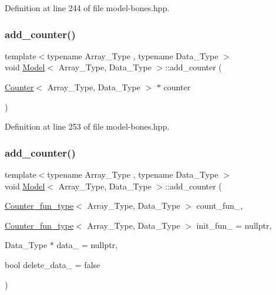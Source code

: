 Definition at line 244 of file model-\/bones.\+hpp.

\mbox{\label{class_model_a05265a5a9a12109a4a2b56b3bb42015e}} 
\subsubsection{\texorpdfstring{add\+\_\+counter()}{add\_counter()}\hspace{0.1cm}{\footnotesize\ttfamily [2/3]}}
{\footnotesize\ttfamily template$<$typename Array\+\_\+\+Type , typename Data\+\_\+\+Type $>$ \\
void \hyperlink{class_model}{Model}$<$ Array\+\_\+\+Type, Data\+\_\+\+Type $>$\+::add\+\_\+counter (\begin{DoxyParamCaption}\item[{\hyperlink{class_counter}{Counter}$<$ Array\+\_\+\+Type, Data\+\_\+\+Type $>$ $\ast$}]{counter }\end{DoxyParamCaption})\hspace{0.3cm}{\ttfamily [inline]}}



Definition at line 253 of file model-\/bones.\+hpp.

\mbox{\label{class_model_a950b0429e07047d4774eac60f7c335f2}} 
\subsubsection{\texorpdfstring{add\+\_\+counter()}{add\_counter()}\hspace{0.1cm}{\footnotesize\ttfamily [3/3]}}
{\footnotesize\ttfamily template$<$typename Array\+\_\+\+Type , typename Data\+\_\+\+Type $>$ \\
void \hyperlink{class_model}{Model}$<$ Array\+\_\+\+Type, Data\+\_\+\+Type $>$\+::add\+\_\+counter (\begin{DoxyParamCaption}\item[{\hyperlink{typedefs_8hpp_ac0160f52f564dea3ac033b374cffbfe7}{Counter\+\_\+fun\+\_\+type}$<$ Array\+\_\+\+Type, Data\+\_\+\+Type $>$}]{count\+\_\+fun\+\_\+,  }\item[{\hyperlink{typedefs_8hpp_ac0160f52f564dea3ac033b374cffbfe7}{Counter\+\_\+fun\+\_\+type}$<$ Array\+\_\+\+Type, Data\+\_\+\+Type $>$}]{init\+\_\+fun\+\_\+ = {\ttfamily nullptr},  }\item[{Data\+\_\+\+Type $\ast$}]{data\+\_\+ = {\ttfamily nullptr},  }\item[{bool}]{delete\+\_\+data\+\_\+ = {\ttfamily false} }\end{DoxyParamCaption})\hspace{0.3cm}{\ttfamily [inline]}}



